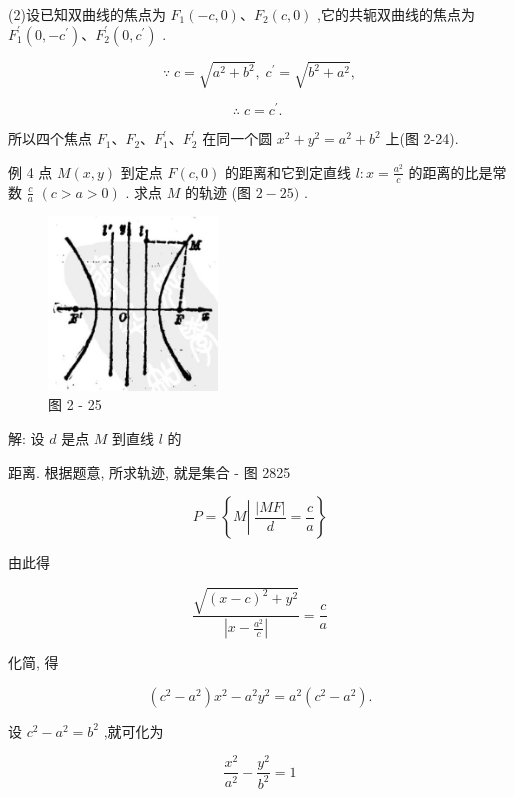 \documentclass[lang=cn,newtx,12pt,scheme=chinese]{elegantbook}
\begin{document}
(2)设已知双曲线的焦点为 \({F}_{1}\left( {-c,0}\right) \text{、}{F}_{2}\left( {c,0}\right)\) ,它的共轭双曲线的焦点为 \({F}_{1}^{\prime }\left( {0, - {c}^{\prime }}\right) \text{、}{F}_{2}^{\prime }\left( {0,{c}^{\prime }}\right)\) .

\[
  \because \;c = \sqrt{{a}^{2} + {b}^{2}},\;{c}^{\prime } = \sqrt{{b}^{2} + {a}^{2}},
\]

\[
  \therefore \;c = {c}^{\prime }\text{. }
\]

所以四个焦点 \({F}_{1}\text{、}{F}_{2}\text{、}{F}_{1}^{\prime }\text{、}{F}_{2}^{\prime }\) 在同一个圆 \({x}^{2} + {y}^{2} = {a}^{2} + {b}^{2}\) 上(图 2-24).

例 4 点 \(M\left( {x,y}\right)\) 到定点 \(F\left( {c,0}\right)\) 的距离和它到定直线 \(l : x = \frac{{a}^{2}}{c}\) 的距离的比是常数 \(\frac{c}{a}\) \(\left( {c > a > 0}\right)\) . 求点 \(M\) 的轨迹 (图 \(2 - {25})\) .

\begin{figure}[h]
  \centering
  \includegraphics[max width=0.4\textwidth]{images/01912cc2-ffb6-728e-9ae7-b113ff05c64b_104_910731.jpg}
  \caption{图 2 - 25}
\end{figure}

解: 设 \(d\) 是点 \(M\) 到直线 \(l\) 的

距离. 根据题意, 所求轨迹, 就是集合 - 图 2825

\[
  P = \left\{ {M\left| {\;\frac{\left| MF\right| }{d} = \frac{c}{a}}\right. }\right\}
\]

由此得

\[
  \frac{\sqrt{{\left( x - c\right) }^{2} + {y}^{2}}}{\left| x - \frac{{a}^{2}}{c}\right| } = \frac{c}{a}
\]

化简, 得

\[
  \left( {{c}^{2} - {a}^{2}}\right) {x}^{2} - {a}^{2}{y}^{2} = {a}^{2}\left( {{c}^{2} - {a}^{2}}\right) .
\]

设 \({c}^{2} - {a}^{2} = {b}^{2}\) ,就可化为

\[
  \frac{{x}^{2}}{{a}^{2}} - \frac{{y}^{2}}{{b}^{2}} = 1
\]
\end{document}
